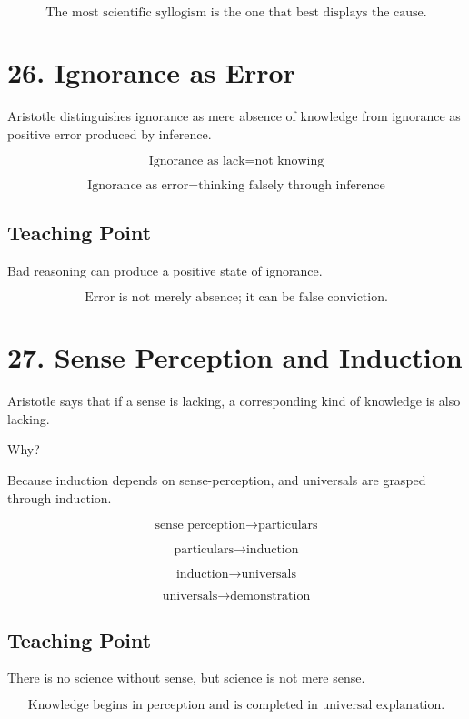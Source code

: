 \documentclass[12pt]{article}
\begin{document}
\[
\boxed{
\text{The most scientific syllogism is the one that best displays the cause.}
}
\]

\section*{26. Ignorance as Error}

Aristotle distinguishes ignorance as mere absence of knowledge from ignorance
as positive error produced by inference.

\[
\text{Ignorance as lack} = \text{not knowing}
\]

\[
\text{Ignorance as error} = \text{thinking falsely through inference}
\]

\subsection*{Teaching Point}

Bad reasoning can produce a positive state of ignorance.

\[
\boxed{
\text{Error is not merely absence; it can be false conviction.}
}
\]

\section*{27. Sense Perception and Induction}

Aristotle says that if a sense is lacking, a corresponding kind of knowledge is
also lacking.

Why?

Because induction depends on sense-perception, and universals are grasped
through induction.

\[
\text{sense perception} \rightarrow \text{particulars}
\]

\[
\text{particulars} \rightarrow \text{induction}
\]

\[
\text{induction} \rightarrow \text{universals}
\]

\[
\text{universals} \rightarrow \text{demonstration}
\]

\subsection*{Teaching Point}

There is no science without sense, but science is not mere sense.

\[
\boxed{
\text{Knowledge begins in perception and is completed in universal explanation.}
}
\]
\end{document}
